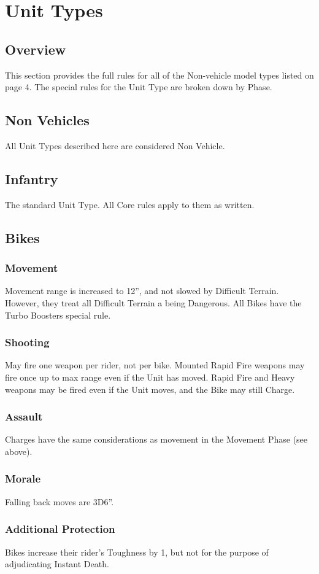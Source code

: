 
\chapter{Unit Types}
\section{Overview}
This section provides the full rules for all of the Non-vehicle
model types listed on page 4. The special rules for the Unit
Type are broken down by Phase.

\section{Non Vehicles}
All Unit Types described here are considered Non Vehicle.
\section{Infantry}
The standard Unit Type. All Core rules apply to them as
written.
\section{Bikes}
\subsection{Movement}
Movement range is increased to 12”, and not slowed by
Difficult Terrain. However, they treat all Difficult Terrain a being
Dangerous. All Bikes have the Turbo Boosters special rule.
\subsection{Shooting}
May fire one weapon per rider, not per bike. Mounted Rapid
Fire weapons may fire once up to max range even if the Unit
has moved. Rapid Fire and Heavy weapons may be fired even
if the Unit moves, and the Bike may still Charge.
\subsection{Assault}
Charges have the same considerations as movement in the
Movement Phase (see above).
\subsection{Morale}
Falling back moves are 3D6”.
\subsection{Additional Protection}
Bikes increase their rider's Toughness by 1, but not for the
purpose of adjudicating Instant Death.
